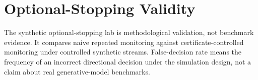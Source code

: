 \section{Optional-Stopping Validity}

The synthetic optional-stopping lab is methodological validation, not benchmark evidence. It compares naive repeated monitoring against certificate-controlled monitoring under controlled synthetic streams. False-decision rate means the frequency of an incorrect directional decision under the simulation design, not a claim about real generative-model benchmarks.
